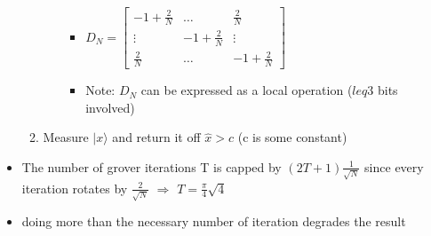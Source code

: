 \documentclass[12pt,a4paper]{article}
\newcommand{\ket}[1]{\vert #1 \rangle}
\begin{document}
\begin{itemize}
\begin{enumerate}
\begin{enumerate}
\begin{itemize}
\item $D_N = \begin{bmatrix} -1 + \frac{2}{N} & \dots & \frac{2}{N} \\ \vdots & -1 + \frac{2}{N}& \vdots\\  \frac{2}{N} & \dots & -1 + \frac{2}{N}\end{bmatrix}$
\item Note: $D_N$ can be expressed as a local operation ($leq 3$ bits involved)
\end{itemize}
\end{enumerate}
\item Measure $\ket{x}$ and return it off $\hat{x}>c$ (c is some constant)
\end{enumerate}
\item The number of grover iterations T is capped by $(2T+1)\frac{1}{\sqrt{N}}$ since every iteration rotates by $\frac{2}{\sqrt{N}}$ $\Rightarrow$ $T=\frac{\pi}{4}\sqrt{4}$
\item doing more than the necessary number of iteration degrades the result
\end{itemize}
\end{document}

